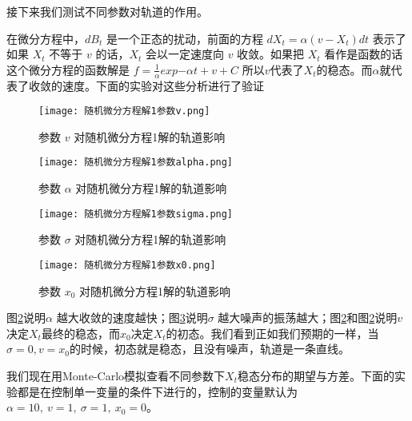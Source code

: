 \documentclass{article}
\begin{document}
接下来我们测试不同参数对轨道的作用。

在微分方程中，$d B_t$ 是一个正态的扰动，前面的方程 $d X_{t}=\alpha\left(v-X_{t}\right) d t$ 表示了如果 $X_t$ 不等于 $v$ 的话，$X_t$ 会以一定速度向 $v$ 收敛。如果把 $X_t$ 看作是函数的话这个微分方程的函数解是 $f = \frac{1}{\alpha} exp{-\alpha t} + v + C$ 所以$v$代表了$X_t$的稳态。而$\alpha$就代表了收敛的速度。下面的实验对这些分析进行了验证


\begin{figure}[H]
    \centering
    \texttt{[image: 随机微分方程解1参数v.png]}
    \caption{参数 $v$ 对随机微分方程1解的轨道影响}
    \label{fig:SDE1_v}
    \end{figure}



\begin{figure}[H]
    \centering
    \texttt{[image: 随机微分方程解1参数alpha.png]}
    \caption{参数 $\alpha$ 对随机微分方程1解的轨道影响}
    \label{fig:SDE1_alpha}
    \end{figure}





\begin{figure}[H]
    \centering
    \texttt{[image: 随机微分方程解1参数sigma.png]}
    \caption{参数 $\sigma$ 对随机微分方程1解的轨道影响}
    \label{fig:SDE1_sigma}
    \end{figure}


\begin{figure}[H]
    \centering
    \texttt{[image: 随机微分方程解1参数x0.png]}
    \caption{参数 $x_0$ 对随机微分方程1解的轨道影响}
    \label{fig:SDE1_x0}
    \end{figure}


图\ref{fig:SDE1_alpha}说明$\alpha$ 越大收敛的速度越快；图\ref{fig:SDE1_sigma}说明$\sigma$ 越大噪声的振荡越大；图\ref{fig:SDE1_alpha}和图\ref{fig:SDE1_alpha}说明$v$ 决定$X_t$最终的稳态，而$x_0$决定$X_t$的初态。我们看到正如我们预期的一样，当$\sigma=0, v = x_0$的时候，初态就是稳态，且没有噪声，轨道是一条直线。

我们现在用Monte-Carlo模拟查看不同参数下$X_t$稳态分布的期望与方差。下面的实验都是在控制单一变量的条件下进行的，控制的变量默认为 $\alpha = 10, \ v=1,\ \sigma=1 , \ x_0 = 0$。
\end{document}
